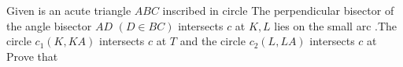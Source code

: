 Given is an acute triangle $ABC$ inscribed in circle The perpendicular bisector of the angle bisector $AD$ $\left(D\in BC\right)$ intersects $c$ at $K,L$  lies on the small arc .The circle $c_1(K,KA)$ intersects $c$ at $T$ and the circle $c_2(L,LA)$ intersects $c$ at Prove that 

